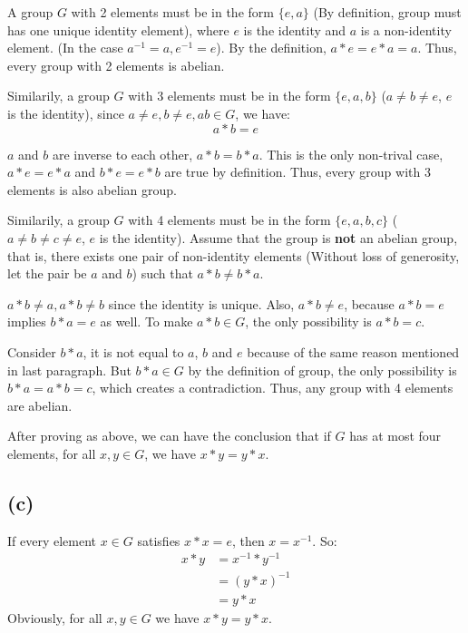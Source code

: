 \documentclass[12pt]{article}
\begin{document}
A group $G$ with 2 elements must be in the form $\{e,a\}$ (By definition, group must has one unique identity element), where $e$ is the identity and $a$ is a  non-identity element. (In the case $a^{-1}=a, e^{-1}=e$). By the definition, $a*e=e*a=a$. Thus, every group with 2 elements is abelian.

Similarily, a group $G$ with 3 elements must be in the form $\{e, a, b\}$ ($a\ne b\ne e$, $e$ is the identity), since $a\ne e,b\ne e,ab\in G$, we have:
$$a*b=e$$

$a$ and $b$ are inverse to each other, $a*b=b*a$. This is the only non-trival case, $a*e=e*a$ and $b*e=e*b$ are true by definition. Thus, every group with 3 elements is also abelian group.


Similarily, a group $G$ with 4 elements must be in the form $\{e, a, b, c\}$ ($a\ne b\ne c\ne e$, $e$ is the identity). Assume that the group is \textbf{not} an abelian group, that is, there exists one pair of non-identity elements (Without loss of generosity, let the pair be $a$ and $b$) such that $a*b\ne b*a$.

$a*b\ne a,a*b\ne b$ since the identity is unique. Also, $a*b\ne e$, because $a*b=e$ implies $b*a=e$ as well. To make $a*b\in G$, the only possibility is $a*b=c$.

Consider $b*a$, it is not equal to $a$, $b$ and $e$ because of the same reason mentioned in last paragraph. But $b*a\in G$ by the definition of group, the only possibility is $b*a=a*b=c$, which creates a contradiction. Thus, any group with 4 elements are abelian.

After proving as above, we can have the conclusion that if $G$ has at most four elements, for all $x,y\in G$, we have $x*y=y*x$.
\subsection*{(c)}
If every element $x\in G$ satisfies $x*x=e$, then $x=x^{-1}$. So:
\begin{align*}
    x*y &= x^{-1}*y^{-1} \\
    &= (y*x)^{-1} \\
    &= y*x
\end{align*}
Obviously, for all $x,y\in G$ we have $x*y=y*x$.
\end{document}
